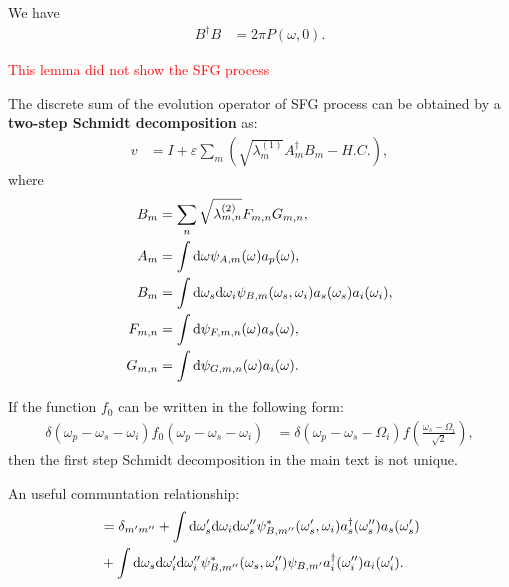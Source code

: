 \documentclass[../../note.tex]{subfiles}
\begin{document}
\begin{lemma}
    We have
    \begin{align}
        B^\dagger B
        &= 2 \pi P(\omega, 0).
    \end{align}
\end{lemma}
\textcolor{red}{This lemma did not show the SFG process}

\begin{lemma}
    The discrete sum of the evolution operator of SFG process can be obtained by a \textbf{two-step Schmidt decomposition} as:
    \begin{align}
        v
        &= I + \varepsilon \sum_{m}\left(\sqrt{\lambda_m^{(1)}} A_m^\dagger B_m - H.C. \right),
    \end{align}
    where 
    \begin{align}
        B_m
        &= \sum_n \sqrt{\lambda_{m,n}^{(2)}} F_{m,n} G_{m,n}, \\
        A_m
        &= \int {\rm d}\omega \psi_{A,m}(\omega)a_p(\omega), \\
        B_m
        &= \int {\rm d}\omega_s{\rm d}\omega_i \psi_{B,m}(\omega_s, \omega_i) a_s(\omega_s)a_i(\omega_i), \\
        F_{m,n}
        &= \int{\rm d}\psi_{F,m,n}(\omega) a_s(\omega), \\
        G_{m,n}
        &= \int {\rm d}\psi_{G,m,n}(\omega)a_i(\omega).
    \end{align} 
\end{lemma}

\begin{lemma}
    If the function $f_0$ can be written in the following form:
    \begin{align}
        \delta(\omega_p - \omega_s -\omega_i) f_0(\omega_p -\omega_s -\omega_i)
        &= \delta(\omega_p - \omega_s - \Omega_i) f(\frac{\omega_s-\Omega_i}{\sqrt{2}}),
    \end{align}
    then the first step Schmidt decomposition in the main text is not unique.
\end{lemma}

\begin{lemma}
    \label{lemma: an useful communtation relationship}
    An useful communtation relationship:
    \begin{align}
        [B_{m'},B^\dagger_{m''}]
        &= \delta_{m'm''} + \int {\rm d}\omega_s'{\rm d}\omega_i{\rm d}\omega_s''\psi^{\ast}_{B,m''}(\omega_s',\omega_i)a^\dagger_{s}(\omega_s'')a_s(\omega_s') \\
        &+\int {\rm d}\omega_s{\rm d}\omega_i'{\rm d}\omega_i''\psi^{\ast}_{B,m''}(\omega_s,\omega_i'')\psi_{B,m'}a^\dagger_{i}(\omega_i'')a_i(\omega_i').
    \end{align}
\end{lemma}
\end{document}
